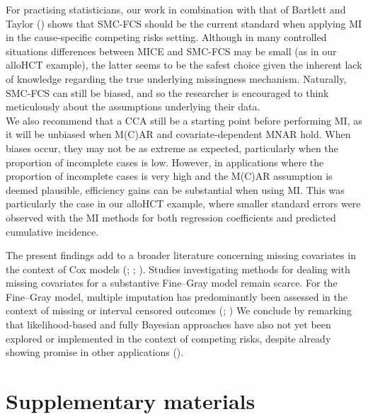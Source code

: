 \documentclass[
  letterpaper,
  paper=240mm:170mm,
  twoside=true,
  open=right,
  fontsize=10pt,
  pagesize=false,
  BCOR=15mm,
  DIV=14,
  headinclude=true,
  footinclude=false,
  headsepline=on]{scrbook}
\begin{document}
For practising statisticians, our work in combination with that of
Bartlett and Taylor
() shows that
SMC-FCS should be the current standard when applying MI in the
cause-specific competing risks setting. Although in many controlled
situations differences between MICE and SMC-FCS may be small (as in our
alloHCT example), the latter seems to be the safest choice given the
inherent lack of knowledge regarding the true underlying missingness
mechanism. Naturally, SMC-FCS can still be biased, and so the researcher
is encouraged to think meticulously about the assumptions underlying
their data.\\
We also recommend that a CCA still be a starting point before performing
MI, as it will be unbiased when M(C)AR and covariate-dependent MNAR
hold. When biases occur, they may not be as extreme as expected,
particularly when the proportion of incomplete cases is low. However, in
applications where the proportion of incomplete cases is very high and
the M(C)AR assumption is deemed plausible, efficiency gains can be
substantial when using MI. This was particularly the case in our alloHCT
example, where smaller standard errors were observed with the MI methods
for both regression coefficients and predicted cumulative incidence.

The present findings add to a broader literature concerning missing
covariates in the context of Cox models
(;
; ). Studies investigating methods for dealing with missing
covariates for a substantive Fine--Gray model remain scarce. For the
Fine--Gray model, multiple imputation has predominantly been assessed in
the context of missing or interval censored outcomes
(;
) We conclude by remarking that likelihood-based and fully Bayesian
approaches have also not yet been explored or implemented in the context
of competing risks, despite already showing promise in other
applications ().

\section*{Supplementary materials}\label{supplementary-materials-1}
\end{document}
